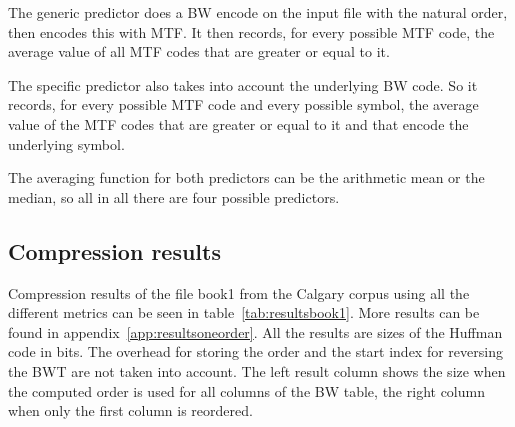 \documentclass[a4paper]{scrreprt}
\begin{document}
The generic predictor does a BW encode on the input file with the natural order,
then encodes this with MTF. It then records, for every possible MTF code, the
average value of all MTF codes that are greater or equal to it.

The specific predictor also takes into account the underlying BW code. So it
records, for every possible MTF code and every possible symbol, the average
value of the MTF codes that are greater or equal to it and that encode the
underlying symbol.

The averaging function for both predictors can be the arithmetic mean or the
median, so all in all there are four possible predictors.

\subsection{Compression results}

Compression results of the file book1 from the Calgary corpus using all the
different metrics can be seen in table~\ref{tab:resultsbook1}. More results can
be found in appendix~\ref{app:resultsoneorder}.
All the results are sizes of the Huffman code in bits. The overhead for storing
the order and the start index for reversing the BWT are not taken into account.
The left result column shows the size when the computed order is used for all
columns of the BW table, the right column when only the first column is
reordered.
\end{document}

